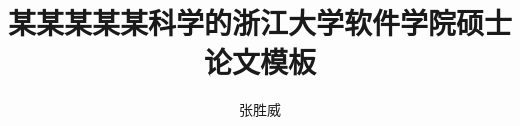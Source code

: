 \documentclass[master,oneside]{zjuthesis} %
\title{某某某某某科学的浙江大学软件学院硕士论文模板} %
\author{张胜威}
\institute{计算机科学与技术学院}         %
\begin{document}
\maketitle

\abstractmatter



\frontmatter
\tableofcontents %
\listoffigures   %
\listoftables    %
%

\mainmatter

%


\backmatter



%




\end{document}
